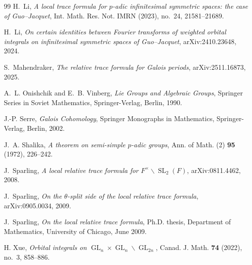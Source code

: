 \documentclass[11pt]{amsart}
\theoremstyle{definition}
\theoremstyle{remark}
\newcommand{\GL}{\operatorname{GL}}
\newcommand{\SL}{\operatorname{SL}}
\begin{document}
\begin{thebibliography}{99}
H.~Li,
\emph{A local trace formula for $p$-adic infinitesimal symmetric spaces: the
case of Guo--Jacquet},
Int. Math. Res. Not. IMRN (2023), no.~24, 21581--21689.

H.~Li,
\emph{On certain identities between Fourier transforms of weighted orbital
integrals on infinitesimal symmetric spaces of Guo--Jacquet},
arXiv:2410.23648, 2024.

S.~Mahendraker,
\emph{The relative trace formula for Galois periods},
arXiv:2511.16873, 2025.

A.~L. Onishchik and E.~B. Vinberg,
\emph{Lie Groups and Algebraic Groups},
Springer Series in Soviet Mathematics, Springer-Verlag, Berlin, 1990.

J.-P. Serre,
\emph{Galois Cohomology},
Springer Monographs in Mathematics, Springer-Verlag, Berlin, 2002.

J.~A. Shalika,
\emph{A theorem on semi-simple $p$-adic groups},
Ann. of Math. (2) \textbf{95} (1972), 226--242.

J.~Sparling,
\emph{A local relative trace formula for $F^\times\backslash\SL_2(F)$},
arXiv:0811.4462, 2008.

J.~Sparling,
\emph{On the $\theta$-split side of the local relative trace formula},
arXiv:0905.0034, 2009.

J.~Sparling,
\emph{On the local relative trace formula},
Ph.D. thesis, Department of Mathematics, University of Chicago, June 2009.

H. Xue,
\emph{Orbital integrals on $\GL_n\times\GL_n\backslash\GL_{2n}$},
Canad. J. Math. \textbf{74} (2022), no.~3, 858--886.

\end{thebibliography}
\end{document}
